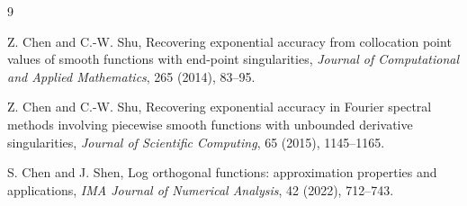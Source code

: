 \documentclass[11pt]{article}
\begin{document}
\begin{thebibliography}{9}

Z. Chen and C.-W. Shu,
\newblock Recovering exponential accuracy from collocation point values of smooth functions with end-point singularities,
\newblock \emph{Journal of Computational and Applied Mathematics}, 265 (2014), 83--95.

Z. Chen and C.-W. Shu,
\newblock Recovering exponential accuracy in Fourier spectral methods involving piecewise smooth functions with unbounded derivative singularities,
\newblock \emph{Journal of Scientific Computing}, 65 (2015), 1145--1165.

S. Chen and J. Shen,
\newblock Log orthogonal functions: approximation properties and applications,
\newblock \emph{IMA Journal of Numerical Analysis}, 42 (2022), 712--743.

\end{thebibliography}
\end{document}
